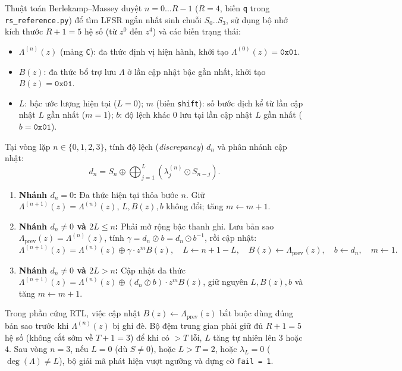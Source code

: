 Thuật toán Berlekamp--Massey duyệt $n = 0 \dots R-1$ ($R=4$, biến \texttt{q} trong \texttt{rs\_reference.py}) để tìm LFSR ngắn nhất sinh chuỗi $S_0..S_3$, sử dụng bộ nhớ kích thước $R+1 = 5$ hệ số (từ $z^0$ đến $z^4$) và các biến trạng thái:
\begin{itemize}
    \item $\Lambda^{(n)}(z)$ (mảng \texttt{C}): đa thức định vị hiện hành, khởi tạo $\Lambda^{(0)}(z) = \texttt{0x01}$.
    \item $B(z)$: đa thức bổ trợ lưu $\Lambda$ ở lần cập nhật bậc gần nhất, khởi tạo $B(z) = \texttt{0x01}$.
    \item $L$: bậc ước lượng hiện tại ($L = 0$); $m$ (biến \texttt{shift}): số bước dịch kể từ lần cập nhật $L$ gần nhất ($m = 1$); $b$: độ lệch khác $0$ lưu tại lần cập nhật $L$ gần nhất ($b = \texttt{0x01}$).
\end{itemize}
Tại vòng lặp $n \in \{0, 1, 2, 3\}$, tính độ lệch (\textit{discrepancy}) $d_n$ và phân nhánh cập nhật:
\begin{equation}
d_n = S_n \oplus \bigoplus_{j=1}^{L} \left(\lambda_j^{(n)} \odot S_{n-j}\right).
\label{eq:bm_discrepancy}
\end{equation}
\begin{enumerate}
    \item \textbf{Nhánh $d_n = 0$:} Đa thức hiện tại thỏa bước $n$. Giữ $\Lambda^{(n+1)}(z) = \Lambda^{(n)}(z)$, $L, B(z), b$ không đổi; tăng $m \leftarrow m + 1$.
    \item \textbf{Nhánh $d_n \neq 0$ và $2L \le n$:} Phải mở rộng bậc thanh ghi. Lưu bản sao $\Lambda_{\text{prev}}(z) = \Lambda^{(n)}(z)$, tính $\gamma = d_n \oslash b = d_n \odot b^{-1}$, rồi cập nhật:
    \begin{equation}
    \Lambda^{(n+1)}(z) = \Lambda^{(n)}(z) \oplus \gamma \cdot z^m B(z), \quad L \leftarrow n + 1 - L, \quad B(z) \leftarrow \Lambda_{\text{prev}}(z), \quad b \leftarrow d_n, \quad m \leftarrow 1.
    \label{eq:bm_update}
    \end{equation}
    \item \textbf{Nhánh $d_n \neq 0$ và $2L > n$:} Cập nhật đa thức $\Lambda^{(n+1)}(z) = \Lambda^{(n)}(z) \oplus (d_n \oslash b) \cdot z^m B(z)$, giữ nguyên $L, B(z), b$ và tăng $m \leftarrow m + 1$.
\end{enumerate}

Trong phần cứng RTL, việc cập nhật $B(z) \leftarrow \Lambda_{\text{prev}}(z)$ bắt buộc dùng đúng bản sao trước khi $\Lambda^{(n)}(z)$ bị ghi đè. Bộ đệm trung gian phải giữ đủ $R+1=5$ hệ số (không cắt sớm về $T+1=3$) để khi có $>T$ lỗi, $L$ tăng tự nhiên lên $3$ hoặc $4$. Sau vòng $n=3$, nếu $L = 0$ (dù $S \neq 0$), hoặc $L > T = 2$, hoặc $\lambda_L = 0$ ($\deg(\Lambda) \neq L$), bộ giải mã phát hiện vượt ngưỡng và dựng cờ \texttt{fail = 1}.

